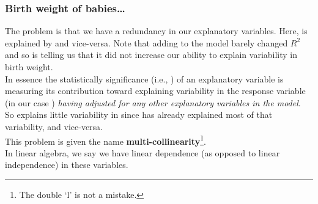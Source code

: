 \documentclass{beamer}\usepackage[]{graphicx}\usepackage[]{xcolor}
\begin{document}
\begin{frame}[fragile]
\frametitle{Birth weight of babies\ldots}
The problem is that we have a redundancy in our explanatory variables.
Here,  is explained by  and vice-versa.
Note that adding  to the model barely changed $R^2$ and so is telling us that it did not increase our ability to explain variability in birth weight.\\
\medskip
In essence the statistically significance (i.e., \pval{}) of an explanatory
variable is measuring its contribution toward explaining variability in the response variable (in our case )
\emph{having adjusted for any other explanatory variables in the model}.\\
\medskip
So  explains little variability in  since  has already
explained most of that variability, and vice-versa.\\
\medskip
This problem is given the name \textbf{multi-collinearity}\footnote{The double `l' is not a mistake.}.\\
\medskip
In linear algebra, we say we have linear dependence (as opposed to linear independence) in these variables.
\end{frame}
\end{document}
